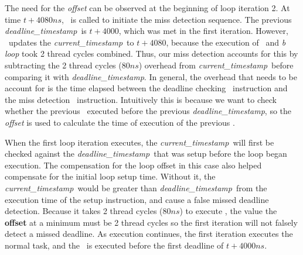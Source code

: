 \newcommand{\currentt}{\emph{current\_timestamp}}
\newcommand{\deadlinet}{\emph{deadline\_timestamp}}

The need for the \emph{offset} can be observed at the beginning of loop iteration 2.
At time $t+4080ns$, \gettime\ is called to initiate the miss detection sequence.
The previous \deadlinet\ is $t+4000$, which was met in the first iteration.  
However, \gettime\ updates the \currentt\ to $t+4080$, because the execution of \delayuntil\ and \emph{b loop} took 2 thread cycles combined. 
Thus, our miss detection accounts for this by subtracting the 2 thread cycles ($80ns$) overhead from \currentt\ before comparing it with \deadlinet.
In general, the overhead that needs to be account for is the time elapsed between the deadline checking \delayuntil\ instruction and the miss detection \gettime\ instruction.
Intuitively this is because we want to check whether the previous \delayuntil\ executed before the previous \deadlinet, so the \emph{offset} is used to calculate the time of execution of the previous \delayuntil.  


When the first loop iteration executes, the \currentt\ will first be checked against the \deadlinet\ that was setup before the loop began execution.
The compensation for the loop offset in this case also helped compensate for the initial loop setup time.
Without it, the \currentt\ would be greater than \deadlinet\ from the execution time of the setup \gettime instruction, and cause a false missed deadline detection.
Because it takes 2 thread cycles ($80ns$) to execute \gettime, the value the \textbf{offset} at a minimum must be 2 thread cycles so the first iteration will not falsely detect a missed deadline.  
As execution continues, the first iteration executes the normal task, and the \delayuntil\ is executed before the first deadline of $t+4000ns$.


